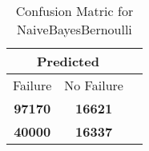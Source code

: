 \begin{table}[] 
\caption{Confusion Matric for NaiveBayesBernoulli} 
\label{Table: Prediction Accuracy-NoneNaiveBayesBernoulliOnlySunEKF-ignoreReflection100.9EKF-top2-Reflection} 
\centering 
\begin{tabular} 
 {@{}ccc@{}} 
\toprule 
\multicolumn{2}{c}{\textbf{Predicted}}
 \\ \midrule 
\multicolumn{1}{|c|}{Failure} & 
\multicolumn{1}{c|}{No Failure}
 \\ \midrule 
\multicolumn{1}{|c|}{\color{green}\textbf{97170}} & 
\multicolumn{1}{c|}{\color{green}\textbf{16621}}
 \\ \midrule 
\multicolumn{1}{|c|}{\color{red}\textbf{40000}} & 
\multicolumn{1}{c|}{\color{red}\textbf{16337}}
 \\ \bottomrule 
\end{tabular} 
\end{table} 
